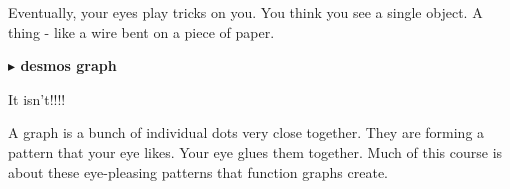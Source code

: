 \documentclass{ximera}
\begin{document}
Eventually, your eyes play tricks on you.  You think you see a single object.  A thing - like a wire bent on a piece of paper.



\begin{image}
\end{image}






\begin{onlineOnly}
\textbf{\textcolor{blue!55!black}{$\blacktriangleright$ desmos graph}} 
\begin{center}
\end{center}
\end{onlineOnly}





\large{It isn't!!!!}




A graph is a bunch of individual dots very close together. They are forming a pattern that your eye likes. Your eye glues them together.  Much of this course is about these eye-pleasing patterns that function graphs create.
\end{document}

